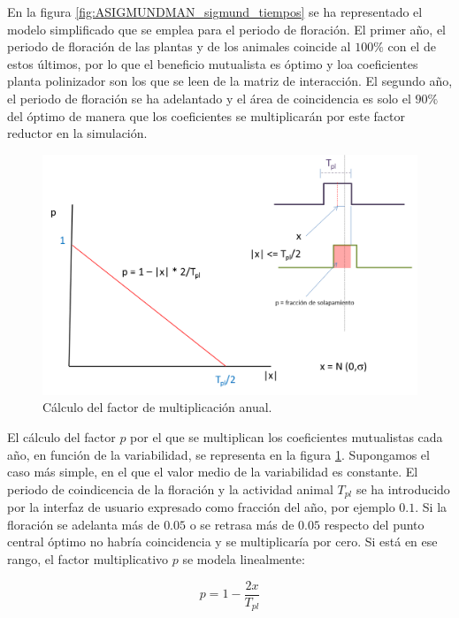 En la figura \ref{fig:ASIGMUNDMAN_sigmund_tiempos} se ha representado el modelo simplificado que se emplea para el periodo de floración. El primer año, el periodo de floración de las
plantas y de los animales coincide al $100\%$ con el de estos últimos, por lo que el beneficio mutualista es óptimo y loa coeficientes planta polinizador son los que se leen de la
matriz de interacción. El segundo año, el periodo de floración se ha adelantado y el área de coincidencia es solo el $90\%$ del óptimo de manera que los coeficientes se multiplicarán por este factor reductor en la simulación.

\begin{figure}[h!]
\centering
\includegraphics[scale=1]{ManFigs/sigmund_pendiente.png}
\caption{Cálculo del factor de multiplicación anual.}
\label{fig:ASIGMUNDMAN_sigmund_pendiente}
\end{figure}

El cálculo del factor $p$ por el que se multiplican los coeficientes mutualistas cada año, en función de la variabilidad, se representa en la figura \ref{fig:ASIGMUNDMAN_sigmund_pendiente}. Supongamos el caso más simple, en el que el valor medio de la variabilidad es constante. El periodo de coindicencia de la floración y la actividad animal $T_{pl}$ se ha introducido por la interfaz de usuario expresado como fracción del año, por ejemplo $0.1$. Si la floración se adelanta más de $0.05$ o se retrasa más de $0.05$ respecto del punto central óptimo no habría coincidencia y se multiplicaría por cero. Si está en ese rango, el factor multiplicativo $p$ se modela linealmente:

\begin{equation}
p = 1 - \frac{2x}{T_{pl}}
\label{eq:sigmund_p}
\end{equation}

